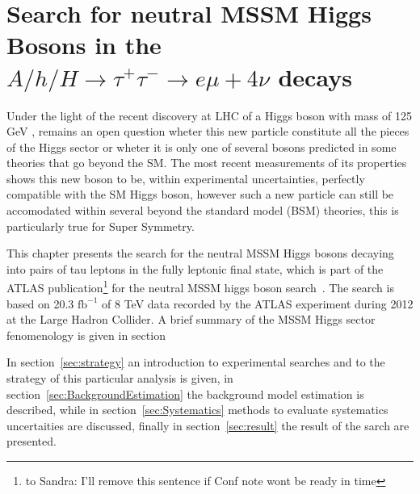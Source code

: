 \chapter[Neutral MSSM Higgs Bosons Search...]{Search for neutral MSSM Higgs Bosons in the 
$A/h/H \rightarrow \tau^{+}\tau^{-} \rightarrow e \mu + 4\nu$ decays} \label{chap:anal}



 \vspace{1cm}

%
%
Under the light of the recent discovery at LHC of a Higgs 
boson with mass of 125 GeV \cite{AHiggsO,CHiggsO}, remains an open question
wheter this new particle constitute all the pieces of the Higgs
sector or wheter it is only one of several bosons predicted in some theories 
that go beyond the SM. The most recent measurements \cite{ASpin0,ACouplings,CFermions,CWidth} of its
properties shows this new boson to be, within experimental uncertainties, perfectly 
compatible with the SM Higgs boson, however such a new particle can still
be accomodated within several beyond the 
standard model (BSM) theories, this is particularly true for Super Symmetry. 

This chapter presents the search for the neutral MSSM Higgs bosons decaying into pairs of tau leptons
in the fully leptonic final state, which is part of the ATLAS publication\footnote{to Sandra: I'll remove this sentence
if Conf note wont be ready in time} for the neutral
MSSM higgs boson search~\cite{}. The search is based on 20.3 $\text{fb}^{-1}$ of 8 TeV data 
recorded by the ATLAS experiment during 2012 at the Large Hadron Collider.
A brief summary of the MSSM Higgs sector fenomenology is given in section

In section~\ref{sec:strategy} an introduction to experimental searches and to the strategy
of this particular analysis is given, in section~\ref{sec:BackgroundEstimation} the background model estimation is described, 
while in section~\ref{sec:Systematics} methods to evaluate systematics uncertaities are discussed, finally 
in section~\ref{sec:result} the result of the sarch are presented.

